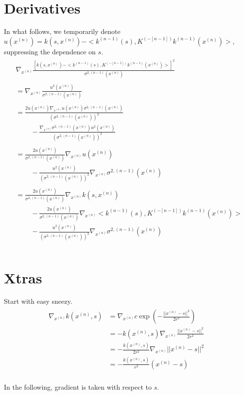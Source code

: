 \documentclass[paper=a4, fontsize=11pt]{scrartcl} %
\numberwithin{equation}{section} %
\numberwithin{figure}{section} %
\numberwithin{table}{section} %
\newcommand{\bars}{ \ \ \ \ \ \ \ \ \ \ }
\newcommand{\gxn}{\nabla_{x^{(n)}}} %
\newcommand{\xn}{x^{(n)}} %
\newcommand{\knm}{k^{(n-1)}}
\newcommand{\Kinvnm}{K^{(-[n-1])}}
\newcommand{\sqnm}{\sigma ^{2 , (n-1)}     }
\newcommand{\signxn}{\sigma^{2, (n-1)} (\xn)}
\newcommand{\vnssqr}{v^2(s;\xn)}
\begin{document}
\section{Derivatives}
In what follows, we temporarily denote $u(\xn) = k(s, \xn)  - < \knm (s) ,  \Kinvnm \knm (\xn) > $, suppressing 
the dependence on $s$. 
\begin{align}
 \begin{split}
 &\gxn \frac{[k(s, \xn)  - < \knm (s) ,  \Kinvnm \knm (\xn) > ]^2}{\signxn}\\\\
%
%
%
%
&= \gxn \frac{ u^2 (\xn) }{\signxn}\\\\
%
%
%
&=\frac{ 2u(\xn)\gxn u(\xn) \signxn}{(\signxn)^2} \\
	    &\bars- \frac{\gxn \signxn u^2(\xn)}{(\signxn)^2} \\\\
%
%
%
&=\frac{ 2u(\xn)}{\signxn} \gxn u(\xn)\\
	    &\bars- \frac{u^2(\xn)}{(\signxn)^2}\gxn \signxn \\\\
%
%
%
%
&=\frac{ 2u(\xn)}{\signxn} \gxn k(s , \xn) \\
	    &\bars - \frac{ 2u(\xn)}{\signxn} \gxn< \knm (s) ,  \Kinvnm \knm (\xn) > \\
	    &\bars - \frac{u^2(\xn)}{(\signxn)^2}\gxn \signxn \\\\
%
%
%
%
%
%
%
 \end{split}
\end{align}


\section{Xtras}
Start with easy sneezy.
\begin{align}
 \begin{split}
  \gxn k(\xn,s) &= \gxn c\exp(-\frac{||\xn - s||^2}{2r^2} )\\
%
&= -k(\xn,s) \gxn\frac{||\xn - s||^2}{2r^2} \\
%
&= -\frac{k(\xn,s)}{2r^2} \gxn||\xn - s||^2 \\
%
&= -\frac{k(\xn ,s)}{r^2} (\xn-s)\\
 \end{split}
\end{align}

In the following, gradient is taken with respect to $s$.
\end{document}

